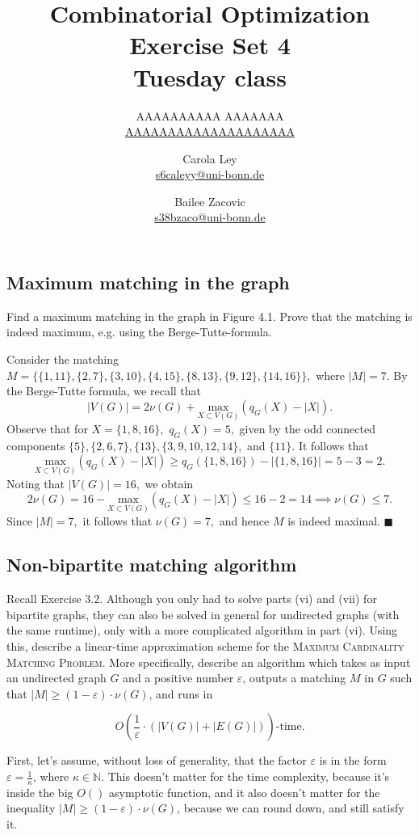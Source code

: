 \documentclass{article}
\title{Combinatorial Optimization \\ Exercise Set 4 \\ Tuesday class}
\author{
  AAAAAAAAAA AAAAAAA \\
  \href{mailto:AAAAAAAAAAAAAAAAAAAA}{AAAAAAAAAAAAAAAAAAAA}
  \and
  Carola Ley \\
  \href{mailto:s6caleyy@uni-bonn.de}{s6caleyy@uni-bonn.de}
  \and
  Bailee Zacovic \\
  \href{mailto:s38bzaco@uni-bonn.de}{s38bzaco@uni-bonn.de}
}
\let\epsilon\varepsilon
\newcommand{\N}{\mathbb{N}}
\begin{document}
  \maketitle

  \setcounter{section}{4}
  \subsection{Maximum matching in the graph}
  \begin{centerframebox}
    Find a maximum matching in the graph in Figure 4.1. Prove that
    the matching is indeed maximum, e.g. using the Berge-Tutte-formula.
  \end{centerframebox}
  Consider the matching $M=\{\{1,11\},\{2,7\},\{3,10\},\{4,15\},\{8,13\},\{9,12\},\{14,16\}\},$ where $|M|=7.$ By the Berge-Tutte formula, we recall that $$|V(G)|=2\nu(G)+\underset{X\subset V(G)}{\text{max}}(q_G(X)-|X|).$$Observe that for $X=\{1,8,16\},$ $q_G(X)=5,$ given by the odd connected components $\{5\},\{2,6,7\},\{13\},\{3,9,10,12,14\},$ and $\{11\}.$ It follows that $$\underset{X\subset V(G)}{\text{max}}(q_G(X)-|X|)\geq q_G(\{1,8,16\})-|\{1,8,16\}|=5-3=2.$$ Noting that $|V(G)|=16,$ we obtain
  $$2\nu(G)=16-\underset{X\subset V(G)}{\text{max}}(q_G(X)-|X|)\leq 16-2=14\implies \nu(G)\leq 7.$$ Since $|M|=7,$ it follows that $\nu(G)=7,$ and hence $M$ is indeed maximal. $\blacksquare$

  \subsection{Non-bipartite matching algorithm}
  \begin{centerframebox}
    Recall Exercise 3.2. Although you only had to solve parts (vi)
    and (vii) for bipartite graphs, they can also be solved in general for undirected
    graphs (with the same runtime), only with a more complicated algorithm in part
    (vi). Using this, describe a linear-time approximation scheme for the \textsc{Maximum
    Cardinality Matching Problem}. More specifically, describe an algorithm
    which takes as input an undirected graph $G$ and a positive number $\epsilon$, outputs a
    matching $M$ in $G$ such that $|M| \geq (1 - \epsilon) \cdot \nu(G)$, and runs in

    $$ O\left(\frac{1}{\epsilon} \cdot (|V (G)| + |E(G)|) \right)\textrm{-time.} $$
  \end{centerframebox}
  First, let's assume, without loss of generality, that the factor $\epsilon$ is in the form $\epsilon = \frac{1}{\kappa}$, where $\kappa \in \N$.
  This doesn't matter for the time complexity, because it's inside the big $O()$ asymptotic function,
  and it also doesn't matter for the inequality $|M| \geq (1 - \epsilon) \cdot \nu(G)$, because we can round down, and still satisfy it.
\end{document}

